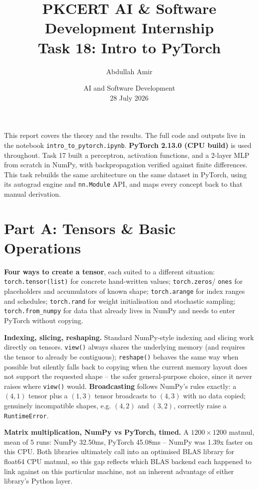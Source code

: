 \documentclass[11pt,a4paper]{article}
\title{\vspace{-1.5cm}\textbf{PKCERT AI \& Software Development Internship \\ Task 18: Intro to PyTorch}}
\author{Abdullah Amir}
\date{AI and Software Development \\ 28 July 2026}
\begin{document}
\maketitle
\vspace{-0.8cm}

This report covers the theory and the results. The full code and outputs live in the
notebook \texttt{intro\_to\_pytorch.ipynb}. \textbf{PyTorch 2.13.0 (CPU build)} is used
throughout. Task 17 built a perceptron, activation functions, and a 2-layer MLP from
scratch in NumPy, with backpropagation verified against finite differences. This task
rebuilds the same architecture on the same dataset in PyTorch, using its autograd engine
and \texttt{nn.Module} API, and maps every concept back to that manual derivation.

\section*{Part A: Tensors \& Basic Operations}

\textbf{Four ways to create a tensor}, each suited to a different situation:
\texttt{torch.tensor(list)} for concrete hand-written values; \texttt{torch.zeros}/
\texttt{ones} for placeholders and accumulators of known shape; \texttt{torch.arange}
for index ranges and schedules; \texttt{torch.rand} for weight initialisation and
stochastic sampling; \texttt{torch.from\_numpy} for data that already lives in NumPy and
needs to enter PyTorch without copying.

\textbf{Indexing, slicing, reshaping.} Standard NumPy-style indexing and slicing work
directly on tensors. \texttt{view()} always shares the underlying memory (and requires
the tensor to already be contiguous); \texttt{reshape()} behaves the same way when
possible but silently falls back to copying when the current memory layout does not
support the requested shape -- the safer general-purpose choice, since it never raises
where \texttt{view()} would. \textbf{Broadcasting} follows NumPy's rules exactly: a
$(4,1)$ tensor plus a $(1,3)$ tensor broadcasts to $(4,3)$ with no data copied;
genuinely incompatible shapes, e.g. $(4,2)$ and $(3,2)$, correctly raise a
\texttt{RuntimeError}.

\textbf{Matrix multiplication, NumPy vs PyTorch, timed.} A $1200\times1200$ matmul,
mean of 5 runs: NumPy 32.50ms, PyTorch 45.08ms -- NumPy was 1.39x faster on this CPU.
Both libraries ultimately call into an optimised BLAS library for float64 CPU matmul, so
this gap reflects which BLAS backend each happened to link against on this particular
machine, not an inherent advantage of either library's Python layer.
\end{document}
